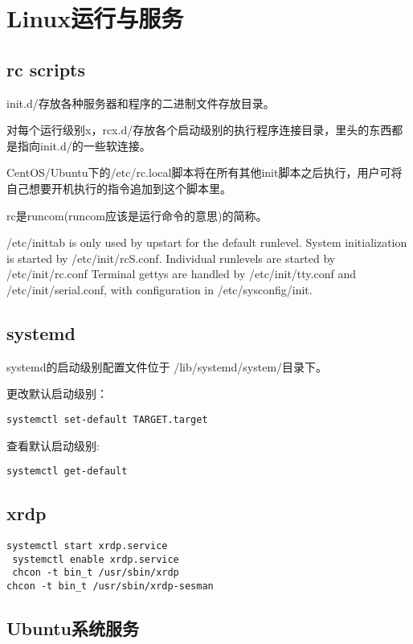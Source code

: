 

\section{Linux运行与服务}


\subsection{rc scripts}

init.d/存放各种服务器和程序的二进制文件存放目录。

对每个运行级别x，rcx.d/存放各个启动级别的执行程序连接目录，里头的东西都是指向init.d/的一些软连接。

CentOS/Ubuntu下的/etc/rc.local脚本将在所有其他init脚本之后执行，用户可将自己想要开机执行的指令追加到这个脚本里。

rc是runcom(runcom应该是运行命令的意思)的简称。

/etc/inittab is only used by upstart for the default runlevel.
System initialization is started by /etc/init/rcS.conf.
 Individual runlevels are started by /etc/init/rc.conf
 Terminal gettys are handled by /etc/init/tty.conf and /etc/init/serial.conf,
 with configuration in /etc/sysconfig/init.



\subsection{systemd}

systemd的启动级别配置文件位于 /lib/systemd/system/目录下。

更改默认启动级别：
\begin{verbatim}
systemctl set-default TARGET.target
\end{verbatim}
查看默认启动级别:
\begin{verbatim}
systemctl get-default
\end{verbatim}

\subsection{xrdp}
\begin{verbatim}
systemctl start xrdp.service
 systemctl enable xrdp.service
 chcon -t bin_t /usr/sbin/xrdp
chcon -t bin_t /usr/sbin/xrdp-sesman
\end{verbatim}

\subsection{Ubuntu系统服务}

